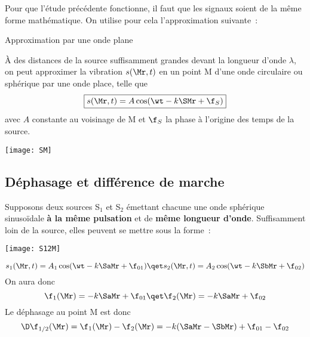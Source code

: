 \documentclass[../main/main.tex]{subfiles}
\begin{document}
Pour que l'étude précédente fonctionne, il faut que les signaux soient de la
même forme mathématique. On utilise pour cela l'approximation suivante~:

\begin{NCprop}[]{Approximation par une onde plane}
    \begin{minipage}{0.55\linewidth}
        
        À des distances de la source suffisamment grandes devant la longueur
        d'onde $\lambda$, on peut approximer la vibration $s(\Mr,t)$ en un point
        M d'une onde circulaire ou sphérique par une onde place, telle que
        \[\boxed{s(\Mr,t) = A\cos(\wt-k\SMr +\f_S)}\] avec $A$ constante au
        voisinage de M et $\f_S$ la phase à l'origine des temps de la source.
    \end{minipage}
    \hfill
    \begin{minipage}{0.40\linewidth}
        \begin{center}
            \texttt{[image: SM]}
        \end{center}
    \end{minipage}
\end{NCprop}

\subsection{Déphasage et différence de marche}
\begin{minipage}{0.65\linewidth}
    Supposons deux sources S$_1$ et S$_2$ émettant chacune une onde sphérique
    sinusoïdale \textbf{à la même pulsation} et de \textbf{même longueur d'onde}.
    Suffisamment loin de la source, elles peuvent se mettre sous la forme~:
\end{minipage}
\hfill
\begin{minipage}{0.30\linewidth}
    \begin{center}
        \texttt{[image: S12M]}
    \end{center}
\end{minipage}
\[
    s_1(\Mr,t) = A_1\cos(\wt - k\SaMr + \f_{01})
    \qet
    s_2(\Mr,t) = A_2\cos(\wt - k\SbMr + \f_{02})
\]
On aura donc
\[
    \f_1(\Mr) = -k\SaMr + \f_{01}
    \qet
    \f_2(\Mr) = -k\SaMr + \f_{02}
\]
Le déphasage au point M est donc
\[\D\f_{1/2}(\Mr) = \f_1(\Mr) - \f_2(\Mr) = -k(\SaMr - \SbMr) + \f_{01} -
\f_{02}\]
\end{document}
